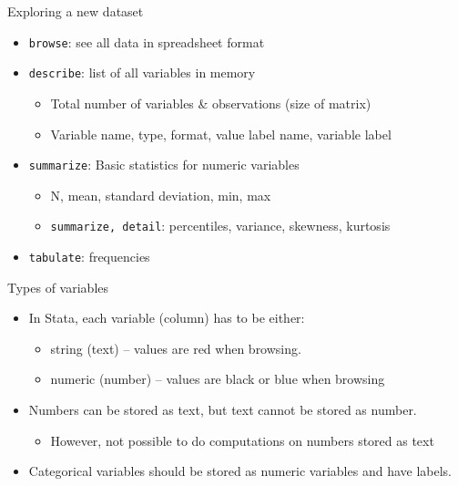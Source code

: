 \documentclass[aspectratio=169]{beamer}
\begin{document}
\begin{frame}{Exploring a new dataset}
	\begin{itemize}
		\item \texttt{browse}: see all data in spreadsheet format
		\item \texttt{describe}: list of all variables in memory
		\begin{itemize}
			\item Total number of variables \& observations (size of matrix)
			\item Variable name, type, format, value label name, variable label
		\end{itemize}
		\item \texttt{summarize}: Basic statistics for numeric variables
		\begin{itemize}
			\item N, mean, standard deviation, min, max
			\item \texttt{summarize, detail}: percentiles, variance, skewness, kurtosis
		\end{itemize}
		\item \texttt{tabulate}: frequencies
	\end{itemize}
\end{frame}


\begin{frame}{Types of variables}
\begin{itemize}
	\item In Stata, each variable (column) has to be either:
	\begin{itemize}
		\item string (text) – values are red when browsing.
		\item numeric (number) – values are black or blue when browsing
	\end{itemize}
	\item Numbers can be stored as text, but text cannot be stored as number.
	\begin{itemize}
		\item 	However, not possible to do computations on numbers stored as text
	\end{itemize}
	\item Categorical variables should be stored as numeric variables and have labels.
\end{itemize}
\end{frame}
\end{document}
